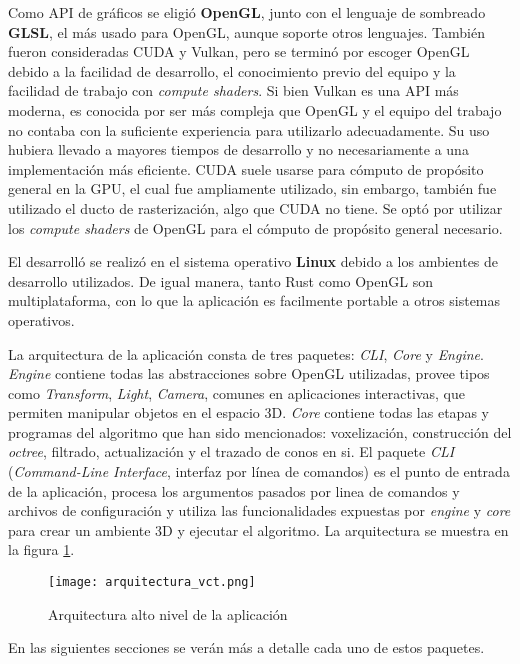 Como API de gráficos se eligió \textbf{OpenGL}, junto con el lenguaje de sombreado \textbf{GLSL}, el más usado para OpenGL, aunque soporte otros lenguajes.
También fueron consideradas CUDA y Vulkan, pero se terminó por escoger OpenGL debido a la facilidad de desarrollo, el conocimiento previo del equipo y la facilidad de trabajo con \textit{compute shaders}.
Si bien Vulkan es una API más moderna, es conocida por ser más compleja que OpenGL y el equipo del trabajo no contaba con la suficiente experiencia para utilizarlo adecuadamente.
Su uso hubiera llevado a mayores tiempos de desarrollo y no necesariamente a una implementación más eficiente.
CUDA suele usarse para cómputo de propósito general en la GPU, el cual fue ampliamente utilizado, sin embargo, también fue utilizado el ducto de rasterización, algo que CUDA no tiene.
Se optó por utilizar los \textit{compute shaders} de OpenGL para el cómputo de propósito general necesario.

El desarrolló se realizó en el sistema operativo \textbf{Linux} debido a los ambientes de desarrollo utilizados.
De igual manera, tanto Rust como OpenGL son multiplataforma, con lo que la aplicación es facilmente portable a otros sistemas operativos.

La arquitectura de la aplicación consta de tres paquetes: \textit{CLI}, \textit{Core} y \textit{Engine}.
\textit{Engine} contiene todas las abstracciones sobre OpenGL utilizadas, provee tipos como \textit{Transform}, \textit{Light}, \textit{Camera}, comunes en aplicaciones interactivas, que permiten manipular objetos en el espacio 3D.
\textit{Core} contiene todas las etapas y programas del algoritmo que han sido mencionados: voxelización, construcción del \textit{octree}, filtrado, actualización y el trazado de conos en si.
El paquete \textit{CLI} (\textit{Command-Line Interface}, interfaz por línea de comandos) es el punto de entrada de la aplicación, procesa los argumentos pasados por linea de comandos y archivos de configuración y utiliza las funcionalidades expuestas por \textit{engine} y \textit{core} para crear un ambiente 3D y ejecutar el algoritmo.
La arquitectura se muestra en la figura \ref{fig:overall_architecture}.

\begin{figure}
    \centering
    \texttt{[image: arquitectura\_vct.png]}
    \caption{Arquitectura alto nivel de la aplicación}
    \label{fig:overall_architecture}
\end{figure}

En las siguientes secciones se verán más a detalle cada uno de estos paquetes.


